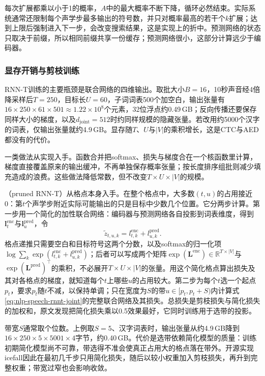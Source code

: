 每次扩展都乘以小于1的概率，$A$中的最大概率不断下降，循环必然结束。实际系统通常还限制每个声学步最多输出的符号数，并只对概率最高的若干个$k$扩展；达到上限后强制进入下一步，会改变搜索结果，这是实现上的折中。预测网络的状态只取决于前缀，所以相同前缀共享一份缓存；预测网络很小，这部分计算远少于编码器。

\subsubsection{显存开销与剪枝训练}
\label{sec:nlp-speech-rnnt-pruned}

RNN-T训练的主要瓶颈是联合网络的四维输出。取批大小$B=16$，10秒声音经4倍降采样后$T=250$，目标长$U=60$，子词词表500个加空白，输出张量有$16\times250\times61\times501\approx1.22\times10^8$个元素，32位浮点约0.49\,GB；反向传播还要保存同样大小的梯度，以及$d_{\mathrm{joint}}=512$时约同样规模的隐藏张量。若改用约5000个汉字的词表，仅输出张量就约4.9\,GB。显存随$T$、$U$与$|V|$的乘积增长，这是CTC与AED都没有的代价。

一类做法从实现入手。函数合并把softmax、损失与梯度合在一个核函数里计算，梯度直接覆盖原来的输出缓冲，不再单独保存概率张量；按长度排序组批则减少填充造成的浪费。这些做法降低常数，但不改变$T\times U\times|V|$的规模。

（pruned RNN-T）从格点本身入手。在整个格点中，大多数$(t,u)$的占用接近0：第$t$个声学步附近实际可能输出的只是目标中少数几个位置。它分两步计算。第一步用一个简化的加性联合网络：编码器与预测网络各自投影到词表维度，得到$\bm{l}^{\mathrm{enc}}_t$与$\bm{l}^{\mathrm{pred}}_u$，令
\begin{equation}
 \tilde{z}_{t,u,k}=l^{\mathrm{enc}}_{t,k}+l^{\mathrm{pred}}_{u,k}.
 \label{eq:nlp-speech-pruned-simple}
\end{equation}
格点递推只需要空白和目标符号这两个分数，以及softmax的归一化项$\log\sum_k\exp(l^{\mathrm{enc}}_{t,k}+l^{\mathrm{pred}}_{u,k})$；后者可以写成两个矩阵$\exp(\bm{L}^{\mathrm{enc}})\in\mathbb{R}^{T\times|V|}$与$\exp(\bm{L}^{\mathrm{pred}})^{\top}$的乘积，不必展开$T\times U\times|V|$的张量。用这个简化格点算出损失及其对各格点的梯度，就知道每个$t$上哪些$u$的占用较大。第二步为每个$t$选一个起点$p_t$，要求$p_t$随$t$不减，以保持单调；只在宽度为$S$的带$u\in[p_t,p_t+S)$内计算式\eqref{eq:nlp-speech-rnnt-joint}的完整联合网络及其损失。总损失是剪枝损失与简化损失的加权和，原文发现把简化损失乘以0.5效果最好，它同时训练用于选带的投影。

带宽$S$通常取个位数。上例取$S=5$、汉字词表时，输出张量从约4.9\,GB降到$16\times250\times5\times5001\times4$字节，约0.40\,GB。代价是选带依赖简化模型的质量：训练初期简化模型尚不可靠，带选得不准会使真正占用大的格点落在带外。开源实现icefall因此在最初几千步只用简化损失，随后以较小权重加入剪枝损失，再升到完整权重；带宽过窄也会影响收敛。

